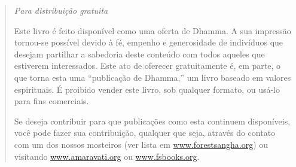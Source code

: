 \cleartoverso
\thispagestyle{empty}

\mbox{}

\vfill

\begin{quote}

{\centering\large\itshape
Para distribuição gratuita
\par}

\bigskip

Este livro é feito disponível como uma oferta de Dhamma. A sua impressão
tornou-se possível devido à fé, empenho e generosidade de indivíduos que desejam
partilhar a sabedoria deste conteúdo com todos aqueles que estiverem
interessados. Este ato de oferecer gratuitamente é, em parte, o que torna esta
uma ``publicação de Dhamma,'' um livro baseado em valores espirituais. É proibido
vender este livro, sob qualquer formato, ou usá-lo para fins comerciais.

\smallskip

Se deseja contribuir para que publicações como esta continuem disponíveis, você
pode fazer sua contribuição, qualquer que seja, através do contato com um dos
nossos mosteiros (ver lista em
\href{http://forestsangha.org}{www.forestsangha.org}) ou visitando
\href{http://amaravati.org}{www.amaravati.org} ou
\href{http://fsbooks.org}{www.fsbooks.org}.

\end{quote}

\vfill

\mbox{}

